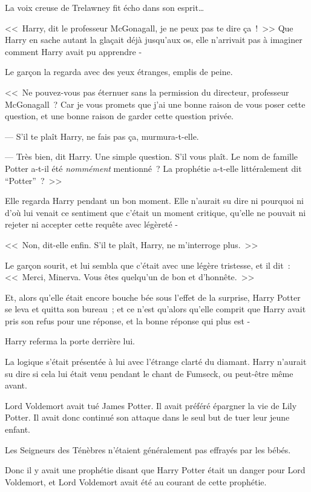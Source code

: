 La voix creuse de Trelawney fit écho dans son esprit…

<<~Harry, dit le professeur McGonagall, je ne peux pas te dire ça~!~>> Que Harry en sache autant la glaçait déjà jusqu'aux os, elle n'arrivait pas à imaginer comment Harry avait pu apprendre -

Le garçon la regarda avec des yeux étranges, emplis de peine.

<<~Ne pouvez-vous pas éternuer sans la permission du directeur, professeur McGonagall~? Car je vous promets que j'ai une bonne raison de vous poser cette question, et une bonne raison de garder cette question privée.

--- S'il te plaît Harry, ne fais pas ça, murmura-t-elle.

--- Très bien, dit Harry. Une simple question. S'il vous plaît. Le nom de famille Potter a-t-il été \emph{nommément} mentionné~? La prophétie a-t-elle littéralement dit “Potter”~?~>>

Elle regarda Harry pendant un bon moment. Elle n'aurait su dire ni pourquoi ni d'où lui venait ce sentiment que c'était un moment critique, qu'elle ne pouvait ni rejeter ni accepter cette requête avec légèreté -

<<~Non, dit-elle enfin. S'il te plaît, Harry, ne m'interroge plus.~>>

Le garçon sourit, et lui sembla que c'était avec une légère tristesse, et il dit~: <<~Merci, Minerva. Vous êtes quelqu'un de bon et d'honnête.~>>

Et, alors qu'elle était encore bouche bée sous l'effet de la surprise, Harry Potter se leva et quitta son bureau~; et ce n'est qu'alors qu'elle comprit que Harry avait pris son refus pour une réponse, et la bonne réponse qui plus est -

Harry referma la porte derrière lui.

La logique s'était présentée à lui avec l'étrange clarté du diamant. Harry n'aurait su dire si cela lui était venu pendant le chant de Fumseck, ou peut-être même avant.

Lord Voldemort avait tué James Potter. Il avait préféré épargner la vie de Lily Potter. Il avait donc continué son attaque dans le seul but de tuer leur jeune enfant.

Les Seigneurs des Ténèbres n'étaient généralement pas effrayés par les bébés.

Donc il y avait une prophétie disant que Harry Potter était un danger pour Lord Voldemort, et Lord Voldemort avait été au courant de cette prophétie.

